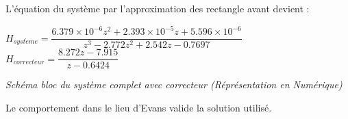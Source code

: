 \documentclass[11pt, french]{article} %
\begin{document}
L'équation du système par l'approximation des rectangle avant devient :
\medskip


\begin{footnotesize}
\begin{center}
$ H_{syst\grave{e}me} = \dfrac{6.379 \times 10^{-6}z^{2} + 2.393 \times 10^{-5}z + 5.596 \times 10^{-6}} {z^{3} - 2.772z^{2} + 2.542z - 0.7697} $
\hspace{2cm}
$  H_{correcteur} = \dfrac {8.272z - 7.915} {z - 0.6424} $
\end{center}
\end{footnotesize}

\begin{center}

\emph{Schéma bloc du système complet avec correcteur (Réprésentation en Numérique)}
\end{center}

Le comportement dans le lieu d'Evans valide la solution utilisé.
\end{document}
